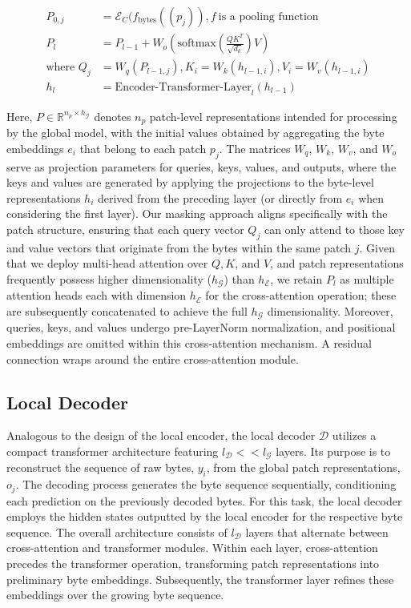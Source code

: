 \begin{align}
P_{0,j} &= \mathcal{E}_{C}(f_\text{bytes}((p_j)), f~ \text{is a pooling function} \\
P_l &= P_{l-1} + W_o\left(\text{softmax}\left(\frac{QK^T}{\sqrt{d_k}}\right)V\right) \\
\text{where } Q_j &= W_q(P_{l-1,j}), K_i = W_k(h_{l-1,i}), V_i = W_v(h_{l-1,i}) \\
h_l &= \text{Encoder-Transformer-Layer}_l(h_{l-1})
\end{align}

Here, $P \in \mathbb{R}^{n_p \times h_{\mathcal{G}}}$ denotes $n_p$ patch-level representations intended for processing by the global model, with the initial values obtained by aggregating the byte embeddings $e_i$ that belong to each patch $p_j$. The matrices $W_q$, $W_k$, $W_v$, and $W_o$ serve as projection parameters for queries, keys, values, and outputs, where the keys and values are generated by applying the projections to the byte-level representations $h_i$ derived from the preceding layer (or directly from $e_i$ when considering the first layer). Our masking approach aligns specifically with the patch structure, ensuring that each query vector $Q_j$ can only attend to those key and value vectors that originate from the bytes within the same patch $j$. Given that we deploy multi-head attention over $Q, K$, and $V$, and patch representations frequently possess higher dimensionality ($h_{\mathcal{G}}$) than $h_{\mathcal{E}}$, we retain $P_l$ as multiple attention heads each with dimension $h_{\mathcal{E}}$ for the cross-attention operation; these are subsequently concatenated to achieve the full $h_{\mathcal{G}}$ dimensionality. Moreover, queries, keys, and values undergo pre-LayerNorm normalization, and positional embeddings are omitted within this cross-attention mechanism. A residual connection wraps around the entire cross-attention module.

\subsection{Local Decoder} 

Analogous to the design of the local encoder, the local decoder $\mathcal{D}$ utilizes a compact transformer architecture featuring $l_{\mathcal{D}} << l_{\mathcal{G}}$ layers. Its purpose is to reconstruct the sequence of raw bytes, $y_i$, from the global patch representations, $o_j$. The decoding process generates the byte sequence sequentially, conditioning each prediction on the previously decoded bytes. For this task, the local decoder employs the hidden states outputted by the local encoder for the respective byte sequence. The overall architecture consists of $l_{\mathcal{D}}$ layers that alternate between cross-attention and transformer modules. Within each layer, cross-attention precedes the transformer operation, transforming patch representations into preliminary byte embeddings. Subsequently, the transformer layer refines these embeddings over the growing byte sequence.

